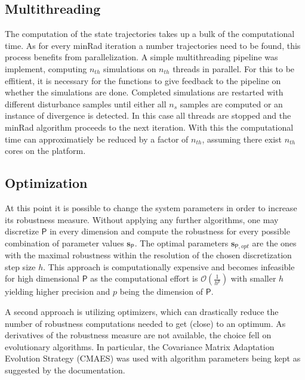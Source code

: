 \subsection{Multithreading} \label{mt}
    
    The computation of the state trajectories takes up a bulk of the computational time. As for every minRad iteration a number trajectories need to be found, this process benefits from parallelization. A simple multithreading pipeline was implement, computing $n_{th}$ simulations on $n_{th}$ threads in parallel. For this to be effitient, it is necessary for the functions to give feedback to the pipeline on whether the simulations are done. Completed simulations are restarted with different disturbance samples until either all $n_s$ samples are computed or an instance of divergence is detected. In this case all threads are stopped and the minRad algorithm proceeds to the next iteration. 
    With this the computational time can approximatiely be reduced by a factor of $n_{th}$, assuming there exist $n_{th}$ cores on the platform. 

\subsection{Optimization} \label{opt}
    
    At this point it is possible to change the system parameters in order to increase its robustness measure.
    Without applying any further algorithms, one may discretize $\mathsf{P}$ in every dimension and compute the robustness for every possible combination of parameter values $\mathbf{s}_{\mathsf{P}}$. The optimal parameters $\mathbf{s}_{\mathsf{P},opt}$ are the ones with the maximal robustness within the resolution of the chosen discretization step size $h$. This approach is computationally expensive and becomes infeasible for high dimensional $\mathsf{P}$ as the computational effort is $\mathcal{O}(\frac{1}{h^p})$ with smaller $h$ yielding higher precision and $p$ being the dimension of $\mathsf{P}$. 
    
    A second approach is utilizing optimizers, which can drastically reduce the number of robustness computations needed to get (close) to an optimum. As derivatives of the robustness measure are not available, the choice fell on evolutionary algorithms. In particular, the Covariance Matrix Adaptation Evolution Strategy (CMAES) was used with algorithm parameters being kept as suggested by the documentation. %


